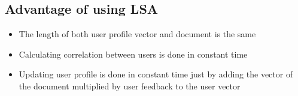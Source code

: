 \subsection{Advantage of using LSA}
\begin{itemize}
\item  The length of both user profile vector and document is the same
\item  Calculating correlation between users is done in constant time
\item  Updating user profile is done in constant time just by adding the vector of the document multiplied by user feedback to the user vector
\end{itemize}









